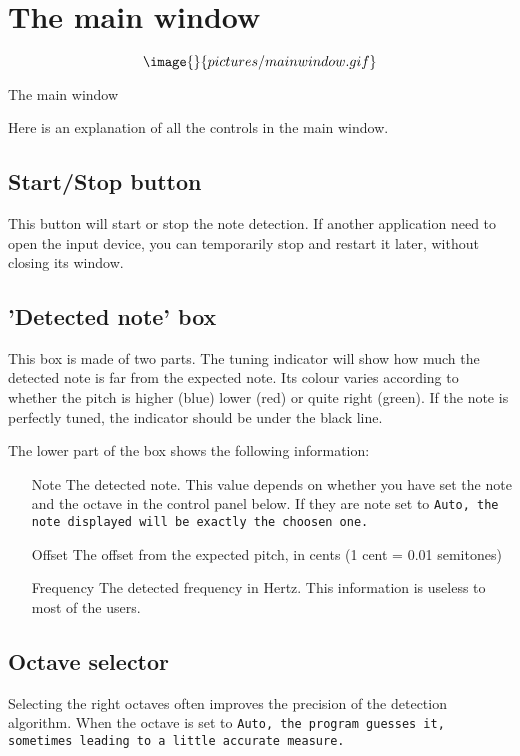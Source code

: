 \section{The main window}\label{mainwindow}

$$\image{}{pictures/mainwindow.gif}$$
\caption{The main window}

Here is an explanation of all the controls in the main window.

\subsection{Start/Stop button}\label{startstop}

This button will start or stop the note detection. If another
application need to open the input device, you can temporarily
stop  and restart it later, without closing its
window.

\subsection{'Detected note' box}\label{detectednote}

This box is made of two parts. The tuning indicator will show
how much the detected note is far from the expected note. Its
colour varies according to whether the pitch is higher (blue)
lower (red) or quite right (green). If the note is perfectly
tuned, the indicator should be under the black line.

The lower part of the box shows the following information:
\begin{itemize}
\item[Note] The detected note. This value depends on whether you
have set the note and the octave in the control panel below. If
they are note set to \tt{Auto}, the note displayed will be exactly
the choosen one.
\item[Offset] The offset from the expected pitch, in cents (1 cent = 
0.01 semitones)
\item[Frequency] The detected frequency in Hertz. This information is
useless to most of the users.
\end{itemize}

\subsection{Octave selector}\label{octave}

Selecting the right octaves often improves the precision of the
detection algorithm. When the octave is set to \tt{Auto}, the program
guesses it, sometimes leading to a little accurate measure.

